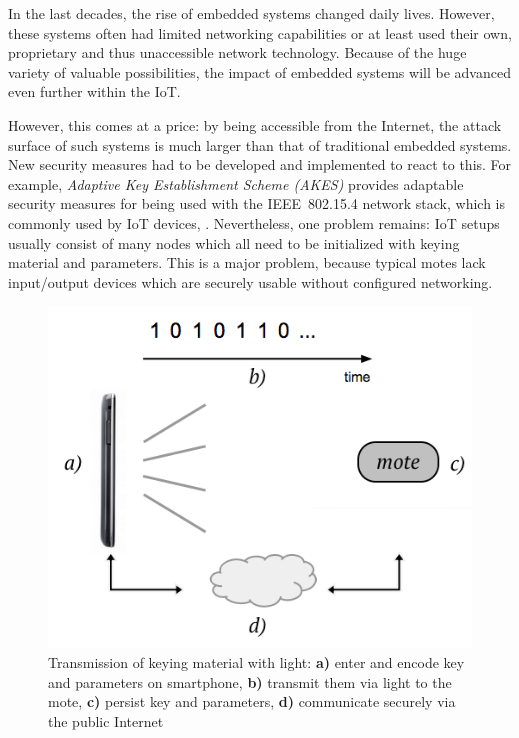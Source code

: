 \documentclass{sig-alternate} %
\begin{document}
In the last decades, the rise of embedded systems changed daily lives.
However, these systems often had limited networking capabilities or at least used their own, proprietary and thus unaccessible network technology.
Because of the huge variety of valuable possibilities, the impact of embedded systems will be advanced even further within the IoT.

However, this comes at a price: by being accessible from the Internet, the attack surface of such systems is much larger than that of traditional embedded systems.
New security measures had to be developed and implemented to react to this.
For example, \textit{Adaptive Key Establishment Scheme (AKES)} provides adaptable security measures for being used with the IEEE~802.15.4 network stack, which is commonly used by IoT devices, \cite{krentz15akes}.
Nevertheless, one problem remains: IoT setups usually consist of many nodes which all need to be initialized with keying material and parameters.
This is a major problem, because typical motes lack input/output devices which are securely usable without configured networking.

\begin{figure}
	\centering
	\includegraphics[scale=.4]{images/overview.png}
	\caption{Transmission of keying material with light: \textbf{a)} enter and encode key and parameters on smartphone, \textbf{b)} transmit them via light to the mote, \textbf{c)} persist key and parameters, \textbf{d)} communicate securely via the public Internet }
	\label{fig:overview}
\end{figure}
\end{document}
